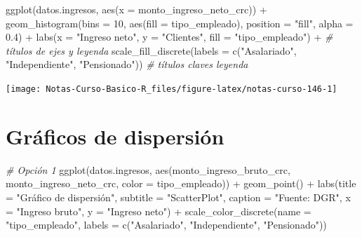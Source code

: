 \documentclass[
  12pt,
]{book}
\newenvironment{Shaded}{\begin{snugshade}}{\end{snugshade}}
\newcommand{\AttributeTok}[1]{\textcolor[rgb]{0.77,0.63,0.00}{#1}}
\newcommand{\CommentTok}[1]{\textcolor[rgb]{0.56,0.35,0.01}{\textit{#1}}}
\newcommand{\DecValTok}[1]{\textcolor[rgb]{0.00,0.00,0.81}{#1}}
\newcommand{\FloatTok}[1]{\textcolor[rgb]{0.00,0.00,0.81}{#1}}
\newcommand{\FunctionTok}[1]{\textcolor[rgb]{0.00,0.00,0.00}{#1}}
\newcommand{\NormalTok}[1]{#1}
\newcommand{\SpecialCharTok}[1]{\textcolor[rgb]{0.00,0.00,0.00}{#1}}
\newcommand{\StringTok}[1]{\textcolor[rgb]{0.31,0.60,0.02}{#1}}
\begin{document}
\begin{Shaded}
\begin{Highlighting}[]
\FunctionTok{ggplot}\NormalTok{(datos.ingresos, }\FunctionTok{aes}\NormalTok{(}\AttributeTok{x =}\NormalTok{ monto\_ingreso\_neto\_crc)) }\SpecialCharTok{+}
  \FunctionTok{geom\_histogram}\NormalTok{(}\AttributeTok{bins =} \DecValTok{10}\NormalTok{, }\FunctionTok{aes}\NormalTok{(}\AttributeTok{fill =}\NormalTok{ tipo\_empleado), }\AttributeTok{position =} \StringTok{"fill"}\NormalTok{, }\AttributeTok{alpha =} \FloatTok{0.4}\NormalTok{) }\SpecialCharTok{+}
  \FunctionTok{labs}\NormalTok{(}\AttributeTok{x =} \StringTok{"Ingreso neto"}\NormalTok{, }\AttributeTok{y =} \StringTok{"Clientes"}\NormalTok{, }\AttributeTok{fill =} \StringTok{"tipo\_empleado"}\NormalTok{) }\SpecialCharTok{+}  \CommentTok{\# títulos de ejes y leyenda}
  \FunctionTok{scale\_fill\_discrete}\NormalTok{(}\AttributeTok{labels =} \FunctionTok{c}\NormalTok{(}\StringTok{"Asalariado"}\NormalTok{, }\StringTok{"Independiente"}\NormalTok{, }\StringTok{"Pensionado"}\NormalTok{))     }\CommentTok{\# títulos claves leyenda}
\end{Highlighting}
\end{Shaded}

\begin{center}\texttt{[image: Notas-Curso-Basico-R\_files/figure-latex/notas-curso-146-1]} \end{center}

\hypertarget{gruxe1ficos-de-dispersiuxf3n}{%
\section{\texorpdfstring{\textbf{Gráficos de dispersión}}{Gráficos de dispersión}}\label{gruxe1ficos-de-dispersiuxf3n}}

\begin{Shaded}
\begin{Highlighting}[]
\CommentTok{\# Opción 1}
\FunctionTok{ggplot}\NormalTok{(datos.ingresos, }\FunctionTok{aes}\NormalTok{(monto\_ingreso\_bruto\_crc, monto\_ingreso\_neto\_crc, }\AttributeTok{color =}\NormalTok{ tipo\_empleado)) }\SpecialCharTok{+}
  \FunctionTok{geom\_point}\NormalTok{() }\SpecialCharTok{+}
  \FunctionTok{labs}\NormalTok{(}\AttributeTok{title =} \StringTok{"Gráfico de dispersión"}\NormalTok{,}
    \AttributeTok{subtitle =} \StringTok{"ScatterPlot"}\NormalTok{,}
    \AttributeTok{caption =} \StringTok{"Fuente: DGR"}\NormalTok{,}
    \AttributeTok{x =} \StringTok{"Ingreso bruto"}\NormalTok{,}
    \AttributeTok{y =} \StringTok{"Ingreso neto"}\NormalTok{) }\SpecialCharTok{+}
  \FunctionTok{scale\_color\_discrete}\NormalTok{(}\AttributeTok{name =} \StringTok{"tipo\_empleado"}\NormalTok{, }\AttributeTok{labels =} \FunctionTok{c}\NormalTok{(}\StringTok{"Asalariado"}\NormalTok{, }\StringTok{"Independiente"}\NormalTok{, }\StringTok{"Pensionado"}\NormalTok{))}
\end{Highlighting}
\end{Shaded}
\end{document}
